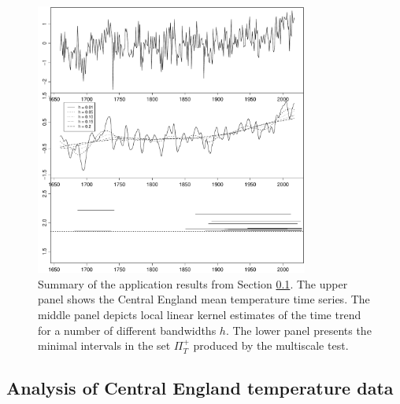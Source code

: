 \begin{figure}[t]
\centering
\includegraphics[width=0.8\textwidth]{Plots/threegraphics_testing_constant_method_ll.pdf}
\vspace{0.2cm}

\caption{Summary of the application results from Section \ref{subsec-data-1}. The upper panel shows the Central England mean temperature time series. The middle panel depicts local linear kernel estimates of the time trend for a number of different bandwidths $h$. The lower panel presents the minimal intervals in the set $\Pi_T^+$ produced by the multiscale test.}\label{plot-results-app1}
\end{figure}


\subsection{Analysis of Central England temperature data}\label{subsec-data-1} 



